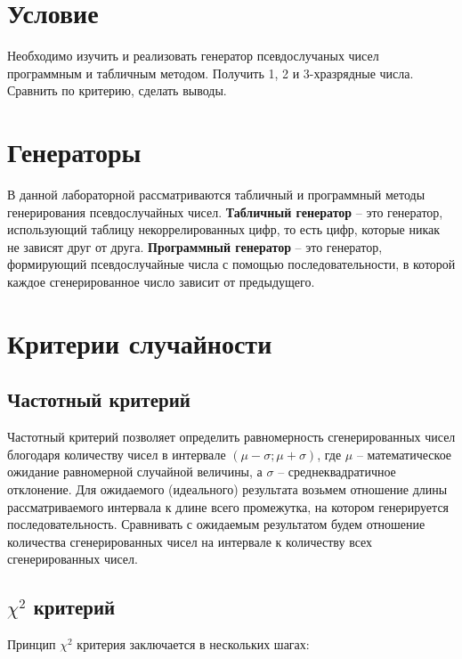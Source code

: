 \section{Условие}

Необходимо изучить и реализовать генератор псевдослучаных чисел программным и табличным методом. Получить 1, 2 и 3-хразрядные числа. Сравнить по критерию, сделать выводы.

\section{Генераторы}

В данной лабораторной рассматриваются табличный и программный методы генерирования псевдослучайных чисел. \textbf{Табличный генератор} -- это генератор, использующий таблицу некоррелированных цифр, то есть цифр, которые никак не зависят друг от друга. \textbf{Программный генератор} -- это генератор, формирующий псевдослучайные числа с помощью последовательности, в которой каждое сгенерированное число зависит от предыдущего.

\section{Критерии случайности}

\subsection{Частотный критерий}

Частотный критерий позволяет определить равномерность сгенерированных чисел блогодаря количеству чисел в интервале $(\mu - \sigma; \mu + \sigma)$, где $\mu$ -- математическое ожидание равномерной случайной величины, а $\sigma$ -- среднеквадратичное отклонение. Для ожидаемого (идеального) результата возьмем отношение длины рассматриваемого интервала к длине всего промежутка, на котором генерируется последовательность. Сравнивать с ожидаемым результатом будем отношение количества сгенерированных чисел на интервале к количеству всех сгенерированных чисел.

\subsection{$\chi^2$ критерий}

Принцип $\chi^2$ критерия заключается в нескольких шагах:

